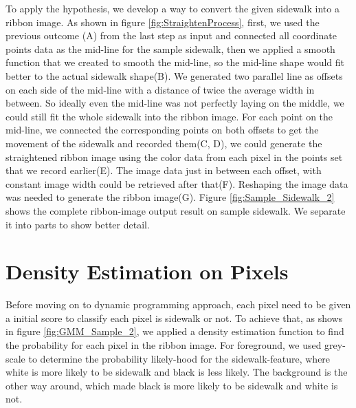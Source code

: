 To apply the hypothesis, we develop a way to convert the given sidewalk into a ribbon image. As shown in figure \ref{fig:StraightenProcess}, first, we used the previous outcome (A) from the last step as input and connected all coordinate points data as the mid-line for the sample sidewalk, then we applied a smooth function that we created to smooth the mid-line, so the mid-line shape would fit better to the actual sidewalk shape(B). We generated two parallel line as offsets on each side of the mid-line with a distance of twice the average width in between. So ideally even the mid-line was not perfectly laying on the middle, we could still fit the whole sidewalk into the ribbon image. For each point on the mid-line, we connected the corresponding points on both offsets to get the movement of the sidewalk and recorded them(C, D), we could generate the straightened ribbon image using the color data from each pixel in the points set that we record earlier(E). The image data just in between each offset, with constant image width could be retrieved after that(F). Reshaping the image data was needed to generate the ribbon image(G). Figure \ref{fig:Sample_Sidewalk_2} shows the complete ribbon-image output result on sample sidewalk. We separate it into parts to show better detail. 

\section{Density Estimation on Pixels}

Before moving on to dynamic programming approach, each pixel need to be given a initial score to classify each pixel is sidewalk or not. To achieve that, as shows in figure \ref{fig:GMM_Sample_2}, we applied a density estimation function to find the probability for each pixel in the ribbon image. For foreground, we used grey-scale to determine the probability likely-hood for the sidewalk-feature, where white is more likely to be sidewalk and black is less likely. The background is the other way around, which made black is more likely to be sidewalk and white is not.

